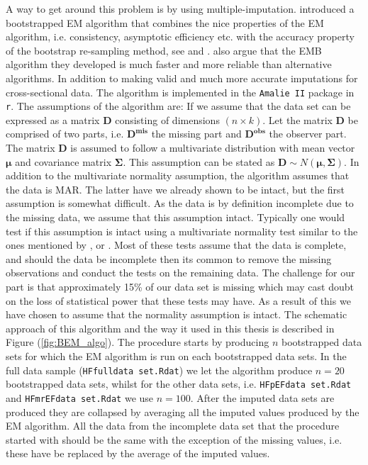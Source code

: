 \documentclass[../thesis.tex]{subfiles}
\begin{document}
\indent A way to get around this problem is by using multiple-imputation. \cite{honaker2011amelia}  introduced a bootstrapped EM algorithm that combines the nice properties of the EM algorithm, i.e. consistency, asymptotic efficiency etc. with the accuracy property of the bootstrap re-sampling method, see \cite{efron1992bootstrap} and \cite{james2013introduction}. \cite{honaker2011amelia} also argue that the EMB algorithm they developed is much faster and more reliable than alternative algorithms. In addition to making valid and much more accurate imputations for cross-sectional data. The algorithm is implemented in the \texttt{Amalie II} package in \texttt{r}. The assumptions of the algorithm are: If we assume that the data set can be expressed as a matrix $\boldsymbol{D}$ consisting of dimensions $(n\times k)$. Let the matrix $\boldsymbol{D}$ be comprised of two parts, i.e. $\boldsymbol{D^{mis}}$ the missing part and $\boldsymbol{D^{obs}}$ the observer part. The matrix $\boldsymbol{D}$ is assumed to follow a multivariate distribution with mean vector $\boldsymbol{\mu}$ and covariance matrix $\boldsymbol{\Sigma}$. This assumption can be stated as $\boldsymbol{D} \sim N\left(\boldsymbol{\mu},  \boldsymbol{\Sigma}\right)$. In addition to the multivariate normality assumption, the algorithm assumes that the data is MAR. The latter have we already shown to be intact, but the first assumption is somewhat difficult. As the data is by definition incomplete due to the missing data, we assume that this assumption intact. Typically one would test if this assumption is intact using a multivariate normality test similar to the ones mentioned by \cite{mardia1970measures}, \cite{henze1990class} or \cite{royston1982extension}. Most of these tests assume that the data is complete, and should the data be incomplete then its common to remove the missing observations and conduct the tests on the remaining data. The challenge for our part is that approximately 15\% of our data set is missing which may cast doubt on the loss of statistical power that these tests may have. As a result of this we have chosen to assume that the normality assumption is intact. The schematic approach of this algorithm and the way it used in this thesis is described in Figure (\ref{fig:BEM_algo}). The procedure starts by producing $n$ bootstrapped data sets for which the EM algorithm is run on each bootstrapped data sets. In the full data sample (\texttt{HFfulldata set.Rdat}) we let the algorithm produce $n = 20$ bootstrapped data sets, whilst for the other data sets, i.e. \texttt{HFpEFdata set.Rdat} and \texttt{HFmrEFdata set.Rdat} we use $n = 100$. After the imputed data sets are produced they are collapsed by averaging all the imputed values produced by the EM algorithm. All the data from the incomplete data set that the procedure started with should be the same with the exception of the missing values, i.e. these have be replaced by the average of the imputed values.
\end{document}
